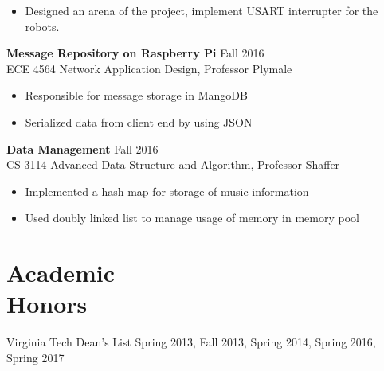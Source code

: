\documentclass[margin]{res}
\begin{document}
\begin{resume}
\begin{itemize}
                 \item  Designed an arena of the project, implement USART interrupter for the robots.

		 \end{itemize}

		{\bf  Message Repository on Raspberry Pi}                                     \hfill       Fall 2016 \\
		{ECE 4564 Network Application Design, Professor Plymale}
                \begin{itemize} \itemsep -2pt
                 \item  Responsible for message storage in MangoDB 
                
                 \item Serialized data from client end by using JSON

		 \end{itemize}

                  {\bf  Data Management}                             \hfill  Fall 2016 \\ 
                  {CS 3114 Advanced Data Structure and Algorithm, Professor Shaffer}  
                  \begin{itemize} \itemsep -2pt
                  \item Implemented a hash map for storage of music information
                  \item Used doubly linked list to manage usage of memory in memory pool
		 \end{itemize}

\section{Academic \\ Honors} 
Virginia Tech Dean's List Spring 2013, Fall 2013, Spring 2014, Spring 2016, Spring 2017
 


\end{resume} 
\end{document}

